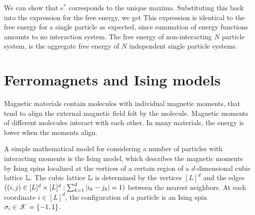 \documentclass[letterpaper,english,10pt]{article}
\begin{document}
\begin{shaded*}
\begin{exmp}
We can show that $e^{\ast}$ corresponds to the unique maxima. %
Substituting this back into the expression for the free energy, we get 
This expression is identical to the free energy for a single particle as expected, 
since summation of energy functions amounts to no interaction system. 
The free energy of non-interacting $N$ particle system, is the aggregate free energy of $N$ independent single particle systems. 
\end{exmp}
\end{shaded*}

\section{Ferromagnets and Ising models}
Magnetic materials contain molecules with individual magnetic moments, that tend to align the external magnetic field felt by the molecule. 
Magnetic moments of different molecules interact with each other. 
In many materials, the energy is lower when the moments align. 

A simple mathematical model for considering a number of particles with interacting moments is the Ising model, which describes the magnetic moments by Ising spins localized at the vertices of a certain region of a $d$-dimensional cubic lattice $\mathbb{L}$. 
The cubic lattice $\mathbb{L}$ is determined by the vertices $[L]^d$ and the edges $((i,j) \in [L]^d \times [L]^d: \sum_{k=1}^d\left\lvert i_k-j_k\right\rvert = 1)$ between the nearest neighbors.  
At each coordinate $i \in [L]^d$, the configuration of a particle is an Ising spin $\sigma_i \in \mathscr{X} = \{-1,1\}$. 
\end{document}
